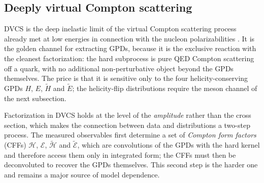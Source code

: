 \subsection{Deeply virtual Compton scattering}
\label{subsec:dvcs}

DVCS is the deep inelastic limit of the virtual Compton scattering process already met at
low energies in connection with the nucleon polarizabilities
\cite[Ch.~2]{ThomasWeise2001}. It is the golden channel for extracting GPDs, because it
is the exclusive reaction with the cleanest factorization: the hard subprocess is pure QED
Compton scattering off a
quark, with no additional non-perturbative object beyond the GPDs themselves. The price
is that it is sensitive only to the four helicity-conserving GPDs $H$, $E$, $\widetilde H$
and $\widetilde E$; the helicity-flip distributions require the meson channel of the next
subsection.

Factorization in DVCS holds at the level of the \emph{amplitude} rather than the cross
section, which makes the connection between data and distributions a two-step process.
The measured observables first determine a set of \emph{Compton form factors} (CFFs)
$\mathcal{H}$, $\mathcal{E}$, $\widetilde{\mathcal{H}}$ and $\widetilde{\mathcal{E}}$,
which are convolutions of the GPDs with the hard kernel and therefore access them only in
integrated form; the CFFs must then be deconvoluted to recover the GPDs themselves. This
second step is the harder one and remains a major source of model dependence.

